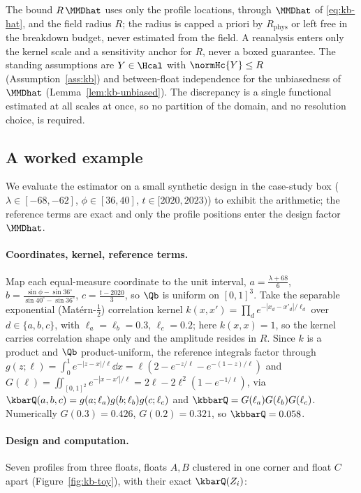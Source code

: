 \begin{remark}
\label{rem:kb-ledger}
The bound $R\,\MMDhat$ uses only the profile locations, through $\MMDhat$ of
\eqref{eq:kb-hat}, and the field radius $R$; the radius is capped a priori by
$R_{\mathrm{phys}}$ or left free in the breakdown budget, never estimated from the
field. A reanalysis enters only the kernel scale and a sensitivity anchor for $R$,
never a boxed guarantee. The standing assumptions are $Y\in\Hcal$ with
$\normHc{Y}\le R$ (Assumption~\ref{ass:kb}) and between-float independence for the
unbiasedness of $\MMDhat$ (Lemma~\ref{lem:kb-unbiased}). The discrepancy is a single
functional estimated at all scales at once, so no partition of the domain, and no
resolution choice, is required.
\end{remark}

\subsection{A worked example}
\label{sec:kb-example}

We evaluate the estimator on a small synthetic design in the case-study box
($\lambda\in[-68,-62]$, $\phi\in[36,40]$, $t\in[2020,2023)$) to exhibit the
arithmetic; the reference terms are exact and only the profile positions enter the
design factor $\MMDhat$.

\paragraph{Coordinates, kernel, reference terms.}
Map each equal-measure coordinate to the unit interval,
$a=\tfrac{\lambda+68}{6}$, $b=\tfrac{\sin\phi-\sin36^\circ}{\sin40^\circ-\sin36^\circ}$,
$c=\tfrac{t-2020}{3}$, so $\Qb$ is uniform on $[0,1]^3$. Take the separable
exponential (Mat\'ern-$\tfrac12$) correlation kernel $k(x,x')=\prod_{d}e^{-|x_d-x'_d|/\ell_d}$
over $d\in\{a,b,c\}$, with $\ell_a=\ell_b=0.3$, $\ell_c=0.2$; here $k(x,x)=1$, so
the kernel carries correlation shape only and the amplitude resides in $R$. Since
$k$ is a product and $\Qb$ product-uniform, the reference integrals factor through
$g(z;\ell)=\int_0^1 e^{-|z-x|/\ell}\dd x=\ell(2-e^{-z/\ell}-e^{-(1-z)/\ell})$ and
$G(\ell)=\iint_{[0,1]^2}e^{-|x-x'|/\ell}=2\ell-2\ell^2(1-e^{-1/\ell})$, via
$\kbarQ(a,b,c)=g(a;\ell_a)g(b;\ell_b)g(c;\ell_c)$ and $\kbbarQ=G(\ell_a)G(\ell_b)G(\ell_c)$.
Numerically $G(0.3)=0.426$, $G(0.2)=0.321$, so $\kbbarQ=0.058$.

\paragraph{Design and computation.}
Seven profiles from three floats, floats $A,B$ clustered in one corner and float
$C$ apart (Figure~\ref{fig:kb-toy}), with their exact $\kbarQ(Z_i)$:

